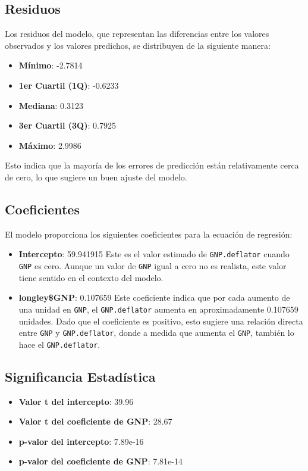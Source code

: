 \documentclass{article}
\begin{document}
\subsection*{Residuos}
Los residuos del modelo, que representan las diferencias entre los valores observados y los valores predichos, se distribuyen de la siguiente manera:
\begin{itemize}
    \item \textbf{Mínimo}: -2.7814
    \item \textbf{1er Cuartil (1Q)}: -0.6233
    \item \textbf{Mediana}: 0.3123
    \item \textbf{3er Cuartil (3Q)}: 0.7925
    \item \textbf{Máximo}: 2.9986
\end{itemize}

Esto indica que la mayoría de los errores de predicción están relativamente cerca de cero, lo que sugiere un buen ajuste del modelo.

\subsection*{Coeficientes}
El modelo proporciona los siguientes coeficientes para la ecuación de regresión:

\begin{itemize}
    \item \textbf{Intercepto}: 59.941915  
    Este es el valor estimado de \texttt{GNP.deflator} cuando \texttt{GNP} es cero. Aunque un valor de \texttt{GNP} igual a cero no es realista, este valor tiene sentido en el contexto del modelo.

    \item \textbf{longley\$GNP}: 0.107659  
    Este coeficiente indica que por cada aumento de una unidad en \texttt{GNP}, el \texttt{GNP.deflator} aumenta en aproximadamente 0.107659 unidades. Dado que el coeficiente es positivo, esto sugiere una relación directa entre \texttt{GNP} y \texttt{GNP.deflator}, donde a medida que aumenta el \texttt{GNP}, también lo hace el \texttt{GNP.deflator}.
\end{itemize}

\subsection*{Significancia Estadística}
\begin{itemize}
    \item \textbf{Valor t del intercepto}: 39.96  
    \item \textbf{Valor t del coeficiente de GNP}: 28.67  
    \item \textbf{p-valor del intercepto}: 7.89e-16  
    \item \textbf{p-valor del coeficiente de GNP}: 7.81e-14  
\end{itemize}
\end{document}
